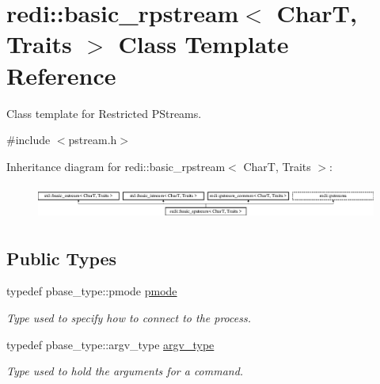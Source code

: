 \hypertarget{classredi_1_1basic__rpstream}{}\section{redi\+:\+:basic\+\_\+rpstream$<$ CharT, Traits $>$ Class Template Reference}
\label{classredi_1_1basic__rpstream}


Class template for Restricted P\+Streams.  




{\ttfamily \#include $<$pstream.\+h$>$}

Inheritance diagram for redi\+:\+:basic\+\_\+rpstream$<$ CharT, Traits $>$\+:\begin{figure}[H]
\begin{center}
\leavevmode
\includegraphics[height=1.147541cm]{classredi_1_1basic__rpstream}
\end{center}
\end{figure}
\subsection*{Public Types}
\begin{DoxyCompactItemize}
\item 
\mbox{\label{classredi_1_1basic__rpstream_aa1921b3fc9985b8a65a7d96d5de4da93}} 
typedef pbase\+\_\+type\+::pmode \mbox{\hyperlink{classredi_1_1basic__rpstream_aa1921b3fc9985b8a65a7d96d5de4da93}{pmode}}
\begin{DoxyCompactList}\small\item\em Type used to specify how to connect to the process. \end{DoxyCompactList}\item 
\mbox{\label{classredi_1_1basic__rpstream_a79d6b6177dbd5d76828781f1dd77b60c}} 
typedef pbase\+\_\+type\+::argv\+\_\+type \mbox{\hyperlink{classredi_1_1basic__rpstream_a79d6b6177dbd5d76828781f1dd77b60c}{argv\+\_\+type}}
\begin{DoxyCompactList}\small\item\em Type used to hold the arguments for a command. \end{DoxyCompactList}\end{DoxyCompactItemize}
